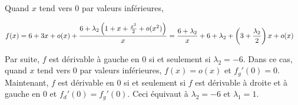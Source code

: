 {\begin{enumerate}
{Quand $x$ tend vers $0$ par valeurs inférieures,

\begin{align*}\ensuremath
f(x)&=6+3x+o(x)+ \frac{6+\lambda_2\left(1+x+ \frac{x^2}{2}+o(x^2)\right)}{x}= \frac{6+\lambda_2}{x}+6+\lambda_2+\left(3+ \frac{\lambda_2}{2}\right)x+o(x)
\end{align*}

Par suite, $f$ est dérivable à gauche en $0$ si et seulement si $\lambda_2=-6$. Dans ce cas, quand $x$ tend vers $0$ par valeurs inférieures, $f(x)=o(x)$ et $f_g'(0)=0$. Maintenant, $f$ est dérivable en $0$ si et seulement si $f$ est dérivable à droite et à gauche en $0$ et $f_d'(0)=f_g'(0)$. Ceci équivaut à $\lambda_2=-6$ et $\lambda_1=1$.

\begin{center}
\end{center}}
\end{enumerate}
}
